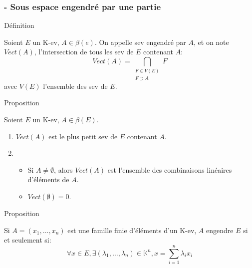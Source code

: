 \documentclass[10pt,a4paper]{beamer}
\newcounter{Def}
\newcounter{Pro}
\newcounter{Sec}
\newcounter{Sub}[Sec]
\begin{document}
\addtocounter{Sec}{1}
\setcounter{Sub}{1}

\begin{frame}
\frametitle{ - Sous espace engendré par une partie}

\begin{block}{Définition \theDef}
\addtocounter{Def}{1}
Soient $E$ un K-ev, $A\in\beta(e)$. On appelle sev engendré par $A$, et on note $Vect(A)$, l'intersection de tous les sev de $E$ contenant $A$: \[ Vect(A) = \bigcap_{\substack{F\in V(E)\\F\supset A}}F \] avec $V(E)$ l'ensemble des sev de $E$.
\end{block}

\begin{block}{Proposition \thePro}
\addtocounter{Pro}{1}
Soient $E$ un K-ev, $A\in\beta(E)$.\begin{enumerate}
\item $Vect(A)$ est le plus petit sev de $E$ contenant $A$.
\item \begin{itemize}
\item Si $A\neq \emptyset$, alors $Vect(A)$ est l'ensemble des combinaisons linéaires d'éléments de $A$.
\item$Vect(\emptyset)=0$.
\end{itemize}
\end{enumerate}
\end{block}
\end{frame}

\begin{frame}
\begin{block}{Proposition \thePro}
\addtocounter{Pro}{1}
Si $A = (x_1,\ldots,x_n)$ est une famille finie d'éléments d'un K-ev, $A$ engendre $E$ si et seulement si:\[ \forall x\in E, \exists(\lambda_1,\ldots,\lambda_n)\in\mathbb{K}^n, x=\sum_{i=1}^{n}\lambda_ix_i\]

\end{block}
\end{frame}
\end{document}
